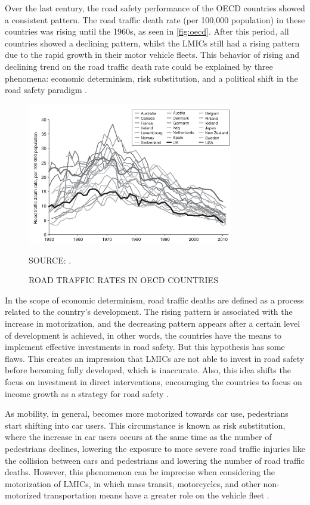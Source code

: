 Over the last century, the road safety performance of the OECD countries showed a consistent pattern. The road traffic death rate (per 100,000 population) in these countries was rising until the 1960s, as seen in \autoref{fig:oecd}. After this period, all countries showed a declining pattern, whilst the LMICs still had a rising pattern due to the rapid growth in their motor vehicle fleets. This behavior of rising and declining trend on the road traffic death rate could be explained by three phenomena: economic determinism, risk substitution, and a political shift in the road safety paradigm \cite{Bhalla2016}.

\begin{figure}[!htbp]
    \centering\footnotesize
    \captionsetup{font=footnotesize}
    \caption{ROAD TRAFFIC RATES IN OECD COUNTRIES}
    \includegraphics[width=0.8\textwidth]{fig/oecd.png}
    \label{fig:oecd}
    \par SOURCE: \textcite{Bhalla2016}.
\end{figure}

In the scope of economic determinism, road traffic deaths are defined as a process related to the country's development. The rising pattern is associated with the increase in motorization, and the decreasing pattern appears after a certain level of development is achieved, in other words, the countries have the means to implement effective investments in road safety. But this hypothesis has some flaws. This creates an impression that LMICs are not able to invest in road safety before becoming fully developed, which is inaccurate. Also, this idea shifts the focus on investment in direct interventions, encouraging the countries to focus on income growth as a strategy for road safety \cite{Bhalla2016}.

As mobility, in general, becomes more motorized towards car use, pedestrians start shifting into car users. This circumstance is known as risk substitution, where the increase in car users occurs at the same time as the number of pedestrians declines, lowering the exposure to more severe road traffic injuries like the collision between cars and pedestrians and lowering the number of road traffic deaths. However, this phenomenon can be imprecise when considering the motorization of LMICs, in which mass transit, motorcycles, and other non-motorized transportation means have a greater role on the vehicle fleet \cite{Bhalla2016}.   

